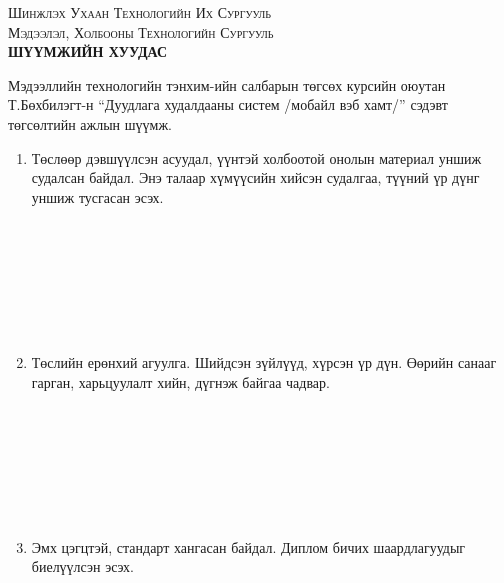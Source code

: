 \documentclass[12pt, a4paper]{report}
\newcommand{\thesistitle}{Дуудлага худалдааны систем /мобайл вэб хамт/}
\newcommand{\authorshort}{Т.Бөхбилэгт}
\newcommand{\universityname}{Шинжлэх Ухаан Технологийн Их Сургууль}
\newcommand{\facultyname}{Мэдээлэл, Холбооны Технологийн Сургууль}
\newcommand{\deptname}{Мэдээллийн технологийн тэнхим}
\begin{document}
\begin{titlepage}
\begin{center}

{\scshape\Large \universityname}\\[0.3cm]
{\scshape\large \facultyname}\\[1cm]

\textbf{{\Large ШҮҮМЖИЙН ХУУДАС}}\\[1cm]

\end{center}

\normalsize

\deptname-ийн салбарын төгсөх курсийн оюутан \authorshort-н ``\thesistitle'' сэдэвт
төгсөлтийн ажлын шүүмж.

\begin{enumerate}
\item Төслөөр дэвшүүлсэн асуудал, үүнтэй холбоотой онолын материал уншиж судалсан байдал.
Энэ талаар хүмүүсийн хийсэн судалгаа, түүний үр дүнг уншиж тусгасан эсэх.
\begin{center}
\dotfill \\[0.1cm] \dotfill \\[0.1cm] \dotfill \\[0.1cm]
\dotfill \\[0.1cm] \dotfill \\[0.1cm] \dotfill \\[0.4cm]
\end{center}

\item Төслийн ерөнхий агуулга. Шийдсэн зүйлүүд, хүрсэн үр дүн. Өөрийн санааг гарган,
харьцуулалт хийн, дүгнэж байгаа чадвар.
\begin{center}
\dotfill \\[0.1cm] \dotfill \\[0.1cm] \dotfill \\[0.1cm]
\dotfill \\[0.1cm] \dotfill \\[0.1cm] \dotfill \\[0.4cm]
\end{center}

\item Эмх цэгцтэй, стандарт хангасан байдал. Диплом бичих шаардлагуудыг биелүүлсэн эсэх.
\begin{center}
\dotfill \\[0.1cm] \dotfill \\[0.1cm] \dotfill \\[0.1cm]
\dotfill \\[0.1cm] \dotfill \\[0.1cm] \dotfill \\[0.4cm]
\end{center}


\end{enumerate}
\end{titlepage}
\end{document}

